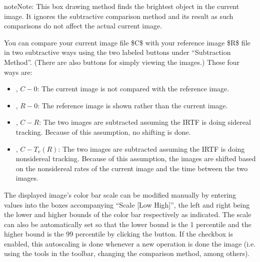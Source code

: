 \documentclass[letterpaper,11pt,english]{sphinxmanual}
\begin{document}
\begin{sphinxadmonition}{note}{Note:}
\sphinxAtStartPar
This box drawing method  finds the brightest object in the current image. It ignores the
subtractive comparison method and its result as such comparisons do not
affect the actual current image.
\end{sphinxadmonition}

\sphinxAtStartPar
You can compare your current image file \$C\$ with your reference image \$R\$ file
in two subtractive ways using the two labeled buttons under
“Subtraction Method”. (There are also buttons for simply viewing the images.)
These four ways are:
\begin{itemize}
\item {} 
\sphinxAtStartPar
{}, \(C-0\): The current image is not compared with the reference image.

\item {} 
\sphinxAtStartPar
{}, \(R-0\): The reference image is shown rather than the current image.

\item {} 
\sphinxAtStartPar
{}, \(C-R\): The two images are subtracted assuming the IRTF is doing sidereal tracking. Because of this assumption, no shifting is done.

\item {} 
\sphinxAtStartPar
{}, \(C-T_v(R)\): The two images are subtracted assuming the IRTF is doing non\sphinxhyphen{}sidereal tracking. Because of this assumption, the images are shifted based on the non\sphinxhyphen{}sidereal rates of the current image and the time between the two images.

\end{itemize}

\sphinxAtStartPar
The displayed image’s color bar scale can be modified manually by entering
values into the boxes accompanying “Scale {[}Low High{]}”, the left and right being
the lower and higher bounds of the color bar respectively as indicated. The
scale can also be automatically set so that the lower bound is the
1 percentile and the higher bound is the 99 percentile by clicking the
 button. If the  checkbox is enabled, this autoscaling
is done whenever a new operation is done the image (i.e. using the tools in
the toolbar, changing the comparison method, among others).
\end{document}
